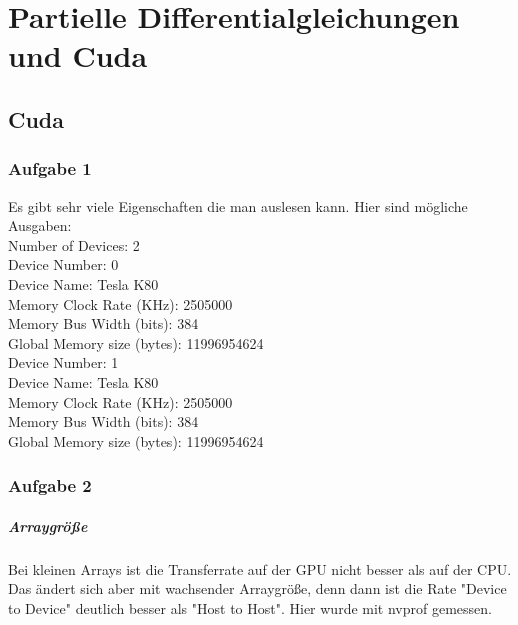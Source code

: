 \documentclass{report}
\begin{document}
\newpage

\chapter{Partielle Differentialgleichungen und Cuda}
\section{Cuda}
\subsection{Aufgabe 1}

Es gibt sehr viele Eigenschaften die man auslesen kann. Hier sind mögliche Ausgaben: \\

Number of Devices: 2\\
Device Number:                0\\
Device Name:                  Tesla K80\\
Memory Clock Rate (KHz):      2505000\\
Memory Bus Width (bits):      384\\
Global Memory size (bytes):   11996954624\\
Device Number:                1\\
Device Name:                  Tesla K80\\
Memory Clock Rate (KHz):      2505000\\
Memory Bus Width (bits):      384\\
Global Memory size (bytes):   11996954624\\

\subsection{Aufgabe 2}

\paragraph{Arraygröße} Bei kleinen Arrays ist die Transferrate auf der GPU nicht besser als auf der CPU. Das ändert sich aber mit wachsender Arraygröße, denn dann ist die Rate "Device to Device" deutlich besser als "Host to Host".
Hier wurde mit nvprof gemessen.
\end{document}
